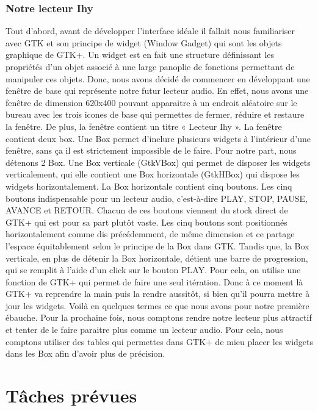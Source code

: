 \documentclass[a4paper,12pt]{article}
\begin{document}
		\subsubsection{Notre lecteur Ihy}
Tout d'abord, avant de développer l'interface idéale  il fallait nous
familiariser avec GTK et son principe de widget (Window Gadget) qui sont les
objets graphique de GTK+. Un widget est en fait une structure définissant les
propriétés d'un objet associé à une large panoplie de fonctions permettant de
manipuler ces objets. Donc, nous avons décidé de commencer en développant une
fenêtre de base qui représente notre futur lecteur audio. En effet, nous avons
une fenêtre de dimension 620x400 pouvant apparaitre à un endroit aléatoire sur
le bureau avec les trois icones de base qui permettes de fermer, réduire et
restaure la fenêtre. De plus, la fenêtre contient un titre « Lecteur Ihy ».  La
fenêtre contient deux box. Une Box permet d'inclure plusieurs widgets à
l'intérieur d'une fenêtre, sans ça il est strictement impossible de le faire.
Pour notre part, nous détenons 2 Box. Une Box verticale (GtkVBox) qui permet de
disposer les widgets verticalement, qui elle contient une Box horizontale
(GtkHBox) qui dispose les widgets horizontalement.  La Box horizontale contient
cinq boutons. Les cinq boutons indispensable pour un lecteur audio, c'est-à-dire
PLAY, STOP, PAUSE, AVANCE et RETOUR. Chacun de ces boutons viennent du stock
direct de GTK+ qui est pour sa part plutôt vaste. Les cinq boutons sont
positionnés horizontalement comme dis précédemment, de même dimension et ce
partage l'espace équitablement selon le principe de la Box dans GTK.  Tandis
que, la Box verticale, en plus de détenir la Box horizontale, détient une barre
de progression, qui se remplit à l'aide d'un click sur le bouton PLAY. Pour
cela, on utilise une fonction de GTK+ qui permet de faire une seul itération.
Donc à ce moment là GTK+ va reprendre la main puis la rendre aussitôt, si bien
qu’il pourra mettre à jour les widgets.        Voilà en quelques termes ce que
nous avons pour notre première ébauche. Pour la prochaine fois, nous comptons
rendre notre lecteur plus attractif et tenter de le faire paraitre plus comme un
lecteur audio. Pour cela, nous comptons utiliser des tables qui permettes dans
GTK+ de mieu placer les widgets dans les Box afin d'avoir plus de précision. 

\section{Tâches prévues}
\end{document}

